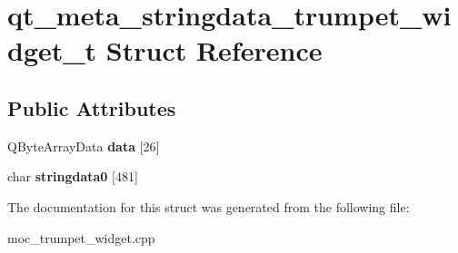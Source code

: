 \hypertarget{structqt__meta__stringdata__trumpet__widget__t}{}\section{qt\+\_\+meta\+\_\+stringdata\+\_\+trumpet\+\_\+widget\+\_\+t Struct Reference}
\label{structqt__meta__stringdata__trumpet__widget__t}
\subsection*{Public Attributes}
\begin{DoxyCompactItemize}
\item 
\mbox{\label{structqt__meta__stringdata__trumpet__widget__t_a6ea2b86c420da9503732ceab024d9767}} 
Q\+Byte\+Array\+Data {\bfseries data} \mbox{[}26\mbox{]}
\item 
\mbox{\label{structqt__meta__stringdata__trumpet__widget__t_a603998917e658e6b7d20472ea30c691d}} 
char {\bfseries stringdata0} \mbox{[}481\mbox{]}
\end{DoxyCompactItemize}


The documentation for this struct was generated from the following file\+:\begin{DoxyCompactItemize}
\item 
moc\+\_\+trumpet\+\_\+widget.\+cpp\end{DoxyCompactItemize}
